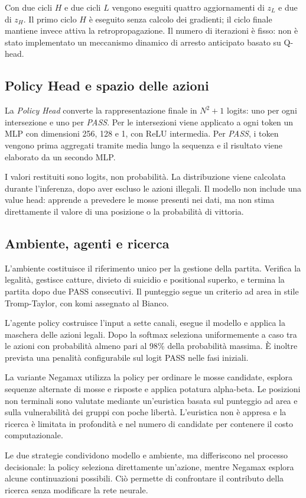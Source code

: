 Con due cicli $H$ e due cicli $L$ vengono eseguiti quattro aggiornamenti di $z_L$ e due di $z_H$. Il primo ciclo $H$ è eseguito senza calcolo dei gradienti; il ciclo finale mantiene invece attiva la retropropagazione. Il numero di iterazioni è fisso: non è stato implementato un meccanismo dinamico di arresto anticipato basato su Q-head.

\subsection{Policy Head e spazio delle azioni}

La \textit{Policy Head} converte la rappresentazione finale in $N^2+1$ logits: uno per ogni intersezione e uno per \textit{PASS}. Per le intersezioni viene applicato a ogni token un MLP con dimensioni 256, 128 e 1, con ReLU intermedia. Per \textit{PASS}, i token vengono prima aggregati tramite media lungo la sequenza e il risultato viene elaborato da un secondo MLP.

I valori restituiti sono logits, non probabilità. La distribuzione viene calcolata durante l'inferenza, dopo aver escluso le azioni illegali. Il modello non include una value head: apprende a prevedere le mosse presenti nei dati, ma non stima direttamente il valore di una posizione o la probabilità di vittoria.

\subsection{Ambiente, agenti e ricerca}

L'ambiente costituisce il riferimento unico per la gestione della partita. Verifica la legalità, gestisce catture, divieto di suicidio e positional superko, e termina la partita dopo due PASS consecutivi. Il punteggio segue un criterio ad area in stile Tromp-Taylor, con komi assegnato al Bianco.

L'agente policy costruisce l'input a sette canali, esegue il modello e applica la maschera delle azioni legali. Dopo la softmax seleziona uniformemente a caso tra le azioni con probabilità almeno pari al 98\% della probabilità massima. È inoltre prevista una penalità configurabile sul logit PASS nelle fasi iniziali.

La variante Negamax utilizza la policy per ordinare le mosse candidate, esplora sequenze alternate di mosse e risposte e applica potatura alpha-beta. Le posizioni non terminali sono valutate mediante un'euristica basata sul punteggio ad area e sulla vulnerabilità dei gruppi con poche libertà. L'euristica non è appresa e la ricerca è limitata in profondità e nel numero di candidate per contenere il costo computazionale.

Le due strategie condividono modello e ambiente, ma differiscono nel processo decisionale: la policy seleziona direttamente un'azione, mentre Negamax esplora alcune continuazioni possibili. Ciò permette di confrontare il contributo della ricerca senza modificare la rete neurale.
